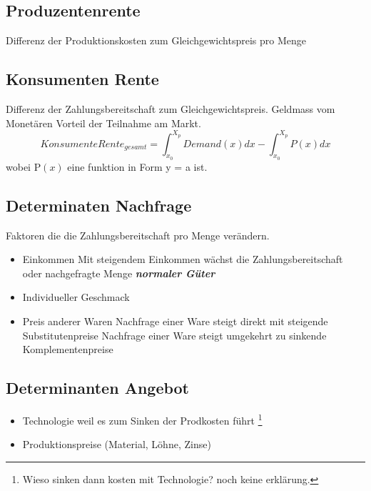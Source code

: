 \subsection{Produzentenrente}

\begin{definition}
    [Produzentenrente] Differenz der Produktionskosten zum Gleichgewichtspreis pro Menge 
\end{definition}


\subsection{Konsumenten Rente}
\begin{definition}
    [Konsumentenrente] Differenz der Zahlungsbereitschaft zum Gleichgewichtspreis. Geldmass vom Monetären Vorteil der Teilnahme am Markt.
    \begin{equation}
        KonsumenteRente_{gesamt} = \int_{x_0}^{X_p}Demand(x)dx - \int_{x_0}^{X_p} P(x) dx
    \end{equation}
    wobei P$(x)$ eine funktion in Form y = a ist.
\end{definition}

\subsection{Determinaten Nachfrage}
Faktoren die die Zahlungsbereitschaft pro Menge verändern.
\begin{itemize}
    \item Einkommen 
        \subitem Mit steigendem Einkommen wächst die Zahlungsbereitschaft oder nachgefragte Menge \textit{\textbf{normaler Güter}}
    \item Individueller Geschmack
    \item Preis anderer Waren
        \subitem Nachfrage einer Ware steigt direkt mit steigende Substitutenpreise
        \subitem Nachfrage einer Ware steigt umgekehrt zu sinkende Komplementenpreise
\end{itemize}

\subsection{Determinanten Angebot}

\begin{itemize}
    \item Technologie
        \subitem weil es zum Sinken der Prodkosten führt \footnote{Wieso sinken dann kosten mit Technologie? noch keine erklärung.}
    \item Produktionspreise (Material, Löhne, Zinse)
\end{itemize}

